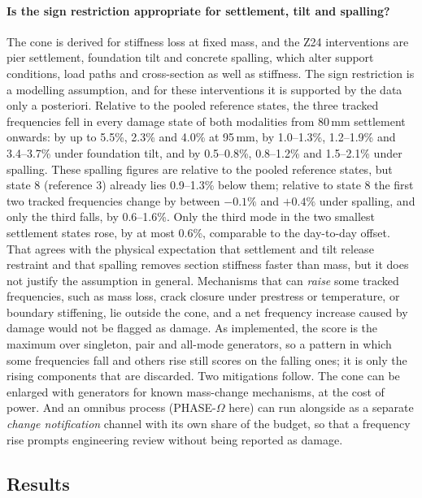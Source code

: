 \documentclass[12pt,a4paper]{article}
\newcommand{\rev}[1]{#1}
\newenvironment{revblock}{}{}
\newcommand{\rev}[1]{{\color{revcol}#1}}
\newenvironment{revblock}{\begingroup\color{revcol}}{\endgroup}
\begin{document}
\begin{revblock}
\paragraph{Is the sign restriction appropriate for settlement, tilt and spalling?} The cone is derived for stiffness loss at fixed mass, and the Z24 interventions are pier settlement, foundation tilt and concrete spalling, which alter support conditions, load paths and cross-section as well as stiffness. The sign restriction is a modelling assumption, and for these interventions it is supported by the data only a posteriori. Relative to the pooled reference states, the three tracked frequencies fell in every damage state of both modalities from 80\,mm settlement onwards: by up to 5.5\%, 2.3\% and 4.0\% at 95\,mm, by 1.0--1.3\%, 1.2--1.9\% and 3.4--3.7\% under foundation tilt, and by 0.5--0.8\%, 0.8--1.2\% and 1.5--2.1\% under spalling. \rev{These spalling figures are relative to the pooled reference states, but state 8 (reference 3) already lies 0.9--1.3\% below them; relative to state 8 the first two tracked frequencies change by between $-0.1\%$ and $+0.4\%$ under spalling, and only the third falls, by 0.6--1.6\%.} Only the third mode in the two smallest settlement states rose, by at most 0.6\%, comparable to the day-to-day offset. That agrees with the physical expectation that settlement and tilt release restraint and that spalling removes section stiffness faster than mass, but it does not justify the assumption in general. Mechanisms that can \emph{raise} some tracked frequencies, such as mass loss, crack closure under prestress or temperature, or boundary stiffening, lie outside the cone, and a net frequency increase caused by damage would not be flagged as damage. As implemented, the score is the maximum over singleton, pair and all-mode generators, so a pattern in which some frequencies fall and others rise still scores on the falling ones; it is only the rising components that are discarded. Two mitigations follow. The cone can be enlarged with generators for known mass-change mechanisms, at the cost of power. And an omnibus process (PHASE-$\Omega$ here) can run alongside as a separate \emph{change notification} channel with its own share of the budget, so that a frequency rise prompts engineering review without being reported as damage.
\end{revblock}

\subsection{Results}\label{sec:z24-results}
\end{document}
